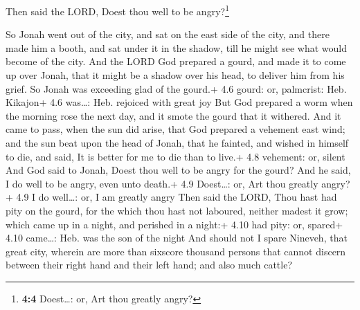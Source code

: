  Then said the LORD, Doest thou well to be
angry?\footnote{\textbf{4:4} Doest\ldots: or, Art thou greatly angry?}

 So Jonah went out of the city, and sat on the east side
of the city, and there made him a booth, and sat under it in the shadow,
till he might see what would become of the city.  And the
LORD God prepared a gourd, and made it to come up over Jonah, that it
might be a shadow over his head, to deliver him from his grief. So Jonah
was exceeding glad of the gourd.+ 4.6 gourd: or, palmcrist: Heb.
Kikajon+ 4.6 was\ldots: Heb. rejoiced with great joy  But
God prepared a worm when the morning rose the next day, and it smote the
gourd that it withered.  And it came to pass, when the sun
did arise, that God prepared a vehement east wind; and the sun beat upon
the head of Jonah, that he fainted, and wished in himself to die, and
said, It is better for me to die than to live.+ 4.8 vehement: or, silent
 And God said to Jonah, Doest thou well to be angry for
the gourd? And he said, I do well to be angry, even unto death.+ 4.9
Doest\ldots: or, Art thou greatly angry?+ 4.9 I do well\ldots: or, I am
greatly angry  Then said the LORD, Thou hast had pity on
the gourd, for the which thou hast not laboured, neither madest it grow;
which came up in a night, and perished in a night:+ 4.10 had pity: or,
spared+ 4.10 came\ldots: Heb. was the son of the night 
And should not I spare Nineveh, that great city, wherein are more than
sixscore thousand persons that cannot discern between their right hand
and their left hand; and also much cattle?
